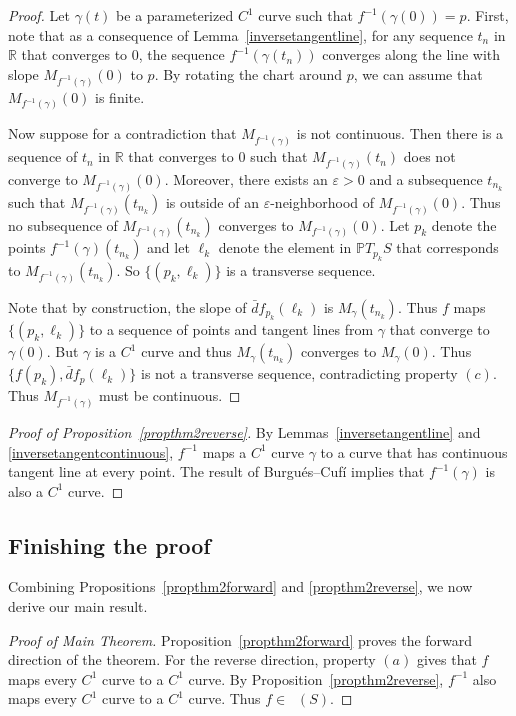 \documentclass[sn-mathphys-num]{sn-jnl}%
\theoremstyle{thmstyleone}%
\theoremstyle{thmstyletwo}%
\theoremstyle{thmstylethree}%
\DeclareMathOperator{\thomeo}{Homeo^{1}}
\begin{document}
\begin{proof}
Let $\gamma(t)$ be a parameterized $C^1$ curve such that $f^{-1}(\gamma(0)) = p$. 
First, note that as a consequence of Lemma~\ref{inversetangentline},  for any sequence $t_n$ in $\mathbb{R}$ that converges to 0,  the sequence $f^{-1}(\gamma(t_n))$ converges along the line with slope $M_{f^{-1}(\gamma)}(0)$ to $p$. By rotating the chart around $p$, we can assume that $M_{f^{-1}(\gamma)}(0)$ is finite.

Now suppose for a contradiction that $M_{f^{-1}(\gamma)}$ is not continuous. Then there is a sequence of $t_n$ in $\mathbb{R}$ that converges to $0$ such that $M_{f^{-1}(\gamma)}(t_n)$ does not converge to $M_{f^{-1}(\gamma)}(0)$.  Moreover, there exists an $\varepsilon >0$ and a subsequence $t_{n_k}$ such that $M_{f^{-1}(\gamma)}(t_{n_k})$ is outside of an $\varepsilon$-neighborhood of $M_{f^{-1}(\gamma)}(0)$. Thus no subsequence of $M_{f^{-1}(\gamma)}(t_{n_k})$ converges to $M_{f^{-1}(\gamma)}(0)$.  Let $p_k$ denote the points $f^{-1}(\gamma)(t_{n_k})$ and let $\ell_k$ denote the element in $\mathbb{P}T_{p_k}S$ that corresponds to $M_{f^{-1}(\gamma)}(t_{n_k})$.  So $\{(p_k,   \ell_k)\}$ is a transverse sequence.  

Note that by construction,  the slope of $\bar{d}f_{p_k}(\ell_k)$  is $M_{\gamma}(t_{n_k})$.  Thus $f$ maps $\{(p_k,   \ell_k)\}$ to a sequence of points and tangent lines from $\gamma$ that converge to $\gamma(0)$.  But $\gamma$ is a $C^1$ curve and thus $M_{\gamma}(t_{n_k})$ converges to $M_{\gamma}(0)$.  Thus $\{f(p_k), \bar{d}f_p(\ell_k)\}$ is not a transverse sequence, contradicting property $(c)$.  Thus $M_{f^{-1}(\gamma)}$ must be continuous.
\end{proof}


\begin{proof}[Proof of Proposition~\ref{propthm2reverse}]
By Lemmas~\ref{inversetangentline} and \ref{inversetangentcontinuous}, $f^{-1}$ maps a $C^1$ curve $\gamma$ to a curve that has continuous tangent line at every point.  The result of Burgu\'es--Cuf\'i \cite[Theorem 10]{BC} implies that $f^{-1}(\gamma)$ is also a $C^1$ curve. 
\end{proof}

\subsection{Finishing the proof}

Combining Propositions~\ref{propthm2forward} and \ref{propthm2reverse}, we now derive our main result.

\begin{proof}[Proof of Main Theorem]
Proposition~\ref{propthm2forward} proves the forward direction of the theorem.  For the reverse direction,  property $(a)$ gives that $f$ maps every $C^1$ curve to a $C^1$ curve.  By Proposition~\ref{propthm2reverse},  $f^{-1}$ also maps every $C^1$ curve to a $C^1$ curve. Thus $f \in \thomeo(S)$. 
\end{proof}

%

\end{document}

